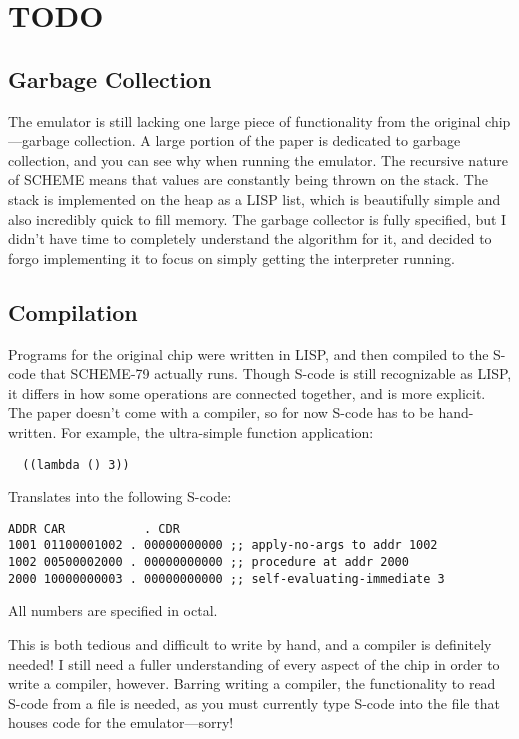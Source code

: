 \documentclass[12pt]{article}
\begin{document}
\section{TODO}
\subsection{Garbage Collection}
The emulator is still lacking one large piece of functionality from
the original chip---garbage collection.  A large portion of the paper
is dedicated to garbage collection, and you can see why when running
the emulator.  The recursive nature of SCHEME means that values are
constantly being thrown on the stack.  The stack is implemented on the
heap as a LISP list, which is beautifully simple and also incredibly
quick to fill memory.  The garbage collector is fully specified, but I
didn't have time to completely understand the algorithm for it, and
decided to forgo implementing it to focus on simply getting the
interpreter running.
\subsection{Compilation}
Programs for the original chip were written in LISP, and then compiled
to the S-code that SCHEME-79 actually runs.  Though S-code is still
recognizable as LISP, it differs in how some operations are connected
together, and is more explicit.  The paper doesn't come with a
compiler, so for now S-code has to be hand-written.  For example, the
ultra-simple function application:
\begin{lstlisting}
  ((lambda () 3))
\end{lstlisting}
Translates into the following S-code:
\begin{lstlisting}
ADDR CAR           . CDR
1001 01100001002 . 00000000000 ;; apply-no-args to addr 1002
1002 00500002000 . 00000000000 ;; procedure at addr 2000
2000 10000000003 . 00000000000 ;; self-evaluating-immediate 3
\end{lstlisting}
All numbers are specified in octal.\par
This is both tedious and difficult to write by hand, and a compiler is
definitely needed!  I still need a fuller understanding of every
aspect of the chip in order to write a compiler, however.  Barring
writing a compiler, the functionality to read S-code from a file is
needed, as you must currently type S-code into the file that houses
code for the emulator---sorry!
\end{document}

